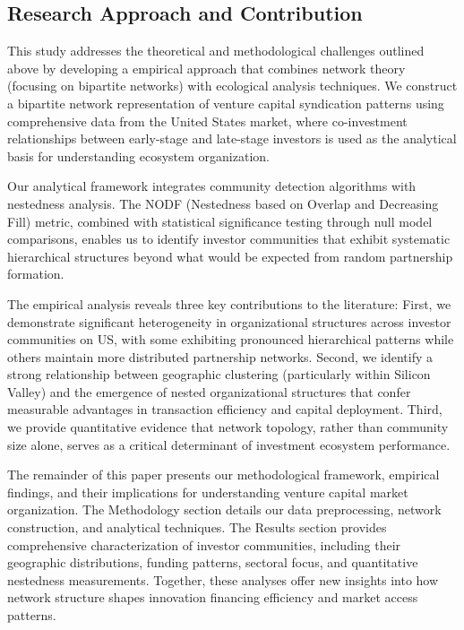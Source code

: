 \subsection{Research Approach and Contribution}

This study addresses the theoretical and methodological challenges outlined above by developing a empirical approach that combines network theory (focusing on bipartite networks) with ecological analysis techniques. We construct a bipartite network representation of venture capital syndication patterns using comprehensive data from the United States market, where co-investment relationships between early-stage and late-stage investors is used as the analytical basis for understanding ecosystem organization.

Our analytical framework integrates community detection algorithms with nestedness analysis. The NODF (Nestedness based on Overlap and Decreasing Fill) metric, combined with statistical significance testing through null model comparisons, enables us to identify investor communities that exhibit systematic hierarchical structures beyond what would be expected from random partnership formation.

The empirical analysis reveals three key contributions to the literature: First, we demonstrate significant heterogeneity in organizational structures across investor communities on US, with some exhibiting pronounced hierarchical patterns while others maintain more distributed partnership networks. Second, we identify a strong relationship between geographic clustering (particularly within Silicon Valley) and the emergence of nested organizational structures that confer measurable advantages in transaction efficiency and capital deployment. Third, we provide quantitative evidence that network topology, rather than community size alone, serves as a critical determinant of investment ecosystem performance.

The remainder of this paper presents our methodological framework, empirical findings, and their implications for understanding venture capital market organization. The Methodology section details our data preprocessing, network construction, and analytical techniques. The Results section provides comprehensive characterization of investor communities, including their geographic distributions, funding patterns, sectoral focus, and quantitative nestedness measurements. Together, these analyses offer new insights into how network structure shapes innovation financing efficiency and market access patterns.

\pagebreak